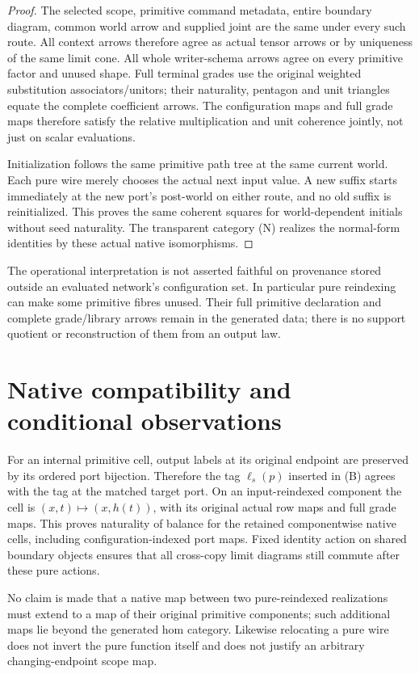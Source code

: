 \documentclass[11pt]{article}
\begin{document}
\begin{proof}
The selected scope, primitive command metadata, entire boundary diagram, common world arrow and supplied joint are the same under every such route. All context arrows therefore agree as actual tensor arrows or by uniqueness of the same limit cone. All whole writer-schema arrows agree on every primitive factor and unused shape. Full terminal grades use the original weighted substitution associators/unitors; their naturality, pentagon and unit triangles equate the complete coefficient arrows. The configuration maps and full grade maps therefore satisfy the relative multiplication and unit coherence jointly, not just on scalar evaluations.

Initialization follows the same primitive path tree at the same current world. Each pure wire merely chooses the actual next input value. A new suffix starts immediately at the new port's post-world on either route, and no old suffix is reinitialized. This proves the same coherent squares for world-dependent initials without seed naturality. The transparent category (N) realizes the normal-form identities by these actual native isomorphisms.\end{proof}
The operational interpretation is not asserted faithful on provenance stored outside an evaluated network's configuration set. In particular pure reindexing can make some primitive fibres unused. Their full primitive declaration and complete grade/library arrows remain in the generated data; there is no support quotient or reconstruction of them from an output law.

\section{Native compatibility and conditional observations}
For an internal primitive cell, output labels at its original endpoint are preserved by its ordered port bijection. Therefore the tag $\ell_s(p)$ inserted in (B) agrees with the tag at the matched target port. On an input-reindexed component the cell is $(x,t)\mapsto(x,h(t))$, with its original actual row maps and full grade maps. This proves naturality of balance for the retained componentwise native cells, including configuration-indexed port maps. Fixed identity action on shared boundary objects ensures that all cross-copy limit diagrams still commute after these pure actions.

No claim is made that a native map between two pure-reindexed realizations must extend to a map of their original primitive components; such additional maps lie beyond the generated hom category. Likewise relocating a pure wire does not invert the pure function itself and does not justify an arbitrary changing-endpoint scope map.
\end{document}
